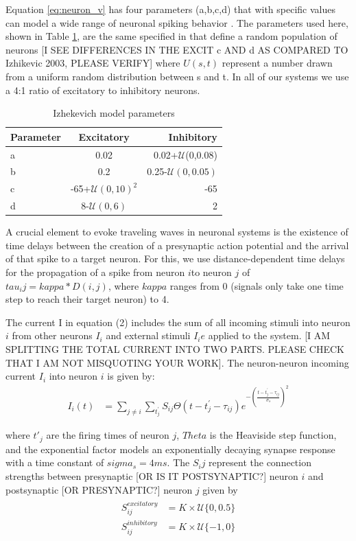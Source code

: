 \documentclass[a4paper,11pt]{article}
\begin{document}
Equation \ref{eq:neuron_v} has four parameters (a,b,c,d) that with specific values can model a wide range of neuronal spiking behavior \cite{izhikevich2003}. 
The parameters used here, shown in Table \ref{tab:izzy_params}, are the same specified in \cite{izhikevich2003} that define a random population of neurons [I SEE DIFFERENCES 
IN THE EXCIT c AND d AS COMPARED TO Izhikevic 2003, PLEASE VERIFY] where $U(s,t)$ represent a number drawn from a uniform random distribution between s and t. 
In all of our systems we use a 4:1 ratio of excitatory to inhibitory neurons.
\begin{table}[!h]
 \caption{Izhekevich model parameters}
 \label{tab:izzy_params}
 \centering
 \begin{tabular}{l|c|r}
  \textbf{Parameter} & \textbf{Excitatory} & \textbf{Inhibitory} \\
  \hline
  a & 0.02 & 0.02+$\mathcal{U}$(0,0.08) \\
  b & 0.2 & 0.25-$\mathcal{U}(0,0.05)$\\
  c & -65+$\mathcal{U}(0,10)^2$ & -65 \\
  d & 8-$\mathcal{U}(0,6)$& 2 \\
 \end{tabular}
\end{table}

A crucial element to evoke traveling waves in neuronal systems is the existence of time delays between the creation of a presynaptic action potential and the arrival of that spike to a target neuron. 
For this, we use distance-dependent time delays for the propagation of a spike from neuron $i$to neuron $j$ of $tau_ij = kappa * D(i,j)$, where $kappa$ ranges from 0 (signals only take one time step to reach their target neuron) to 4. 

The current I in equation (2) includes the sum of all incoming stimuli into neuron $i$ from other neurons $I_i$ and external stimuli $I_ie$ applied to the system.
[I AM SPLITTING THE TOTAL CURRENT INTO TWO PARTS. PLEASE CHECK THAT I AM NOT MISQUOTING YOUR WORK]. 
The neuron-neuron incoming current $I_i$ into neuron $i$ is given by:
\begin{align}
 I_i(t) &= \sum_{j\ne i} \sum_{t^\prime_j} S_{ij}  \Theta(t-t^\prime_j-\tau_{ij})e^{-(\frac{t-t^\prime_j-\tau_{ij}}{\sigma_s})^2}
\end{align}

where $t'_j$ are the firing times of neuron $j$, $Theta$ is the Heaviside step function, and the exponential factor models an exponentially decaying synapse response with a time constant of $sigma_s = 4 ms$. 
The $S_ij$ represent the connection strengths between presynaptic [OR IS IT POSTSYNAPTIC?] neuron $i$ and postsynaptic [OR PRESYNAPTIC?] neuron $j$ given by
\begin{align}
 \begin{split}
  S_{ij}^{excitatory} &= K \times \mathcal{U}\{0,0.5 \} \\
  S_{ij}^{inhibitory} &= K \times \mathcal{U}\{-1,0 \} 
 \end{split}
\end{align}
\end{document}
